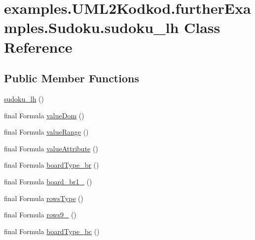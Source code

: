 \hypertarget{classexamples_1_1_u_m_l2_kodkod_1_1further_examples_1_1_sudoku_1_1sudoku__lh}{\section{examples.\-U\-M\-L2\-Kodkod.\-further\-Examples.\-Sudoku.\-sudoku\-\_\-lh Class Reference}
\label{classexamples_1_1_u_m_l2_kodkod_1_1further_examples_1_1_sudoku_1_1sudoku__lh}
}
\subsection*{Public Member Functions}
\begin{DoxyCompactItemize}
\item 
\hyperlink{classexamples_1_1_u_m_l2_kodkod_1_1further_examples_1_1_sudoku_1_1sudoku__lh_ad5248425df2fe22a9e0e633b9776ead4}{sudoku\-\_\-lh} ()
\item 
final Formula \hyperlink{classexamples_1_1_u_m_l2_kodkod_1_1further_examples_1_1_sudoku_1_1sudoku__lh_a614683ab3e07f643d6d7ad8b9ad6c5ac}{value\-Dom} ()
\item 
final Formula \hyperlink{classexamples_1_1_u_m_l2_kodkod_1_1further_examples_1_1_sudoku_1_1sudoku__lh_a62d3a39808d9cefd29e39be936c5f6bc}{value\-Range} ()
\item 
final Formula \hyperlink{classexamples_1_1_u_m_l2_kodkod_1_1further_examples_1_1_sudoku_1_1sudoku__lh_a0d25047acda2d7f0e95fad408f247a19}{value\-Attribute} ()
\item 
final Formula \hyperlink{classexamples_1_1_u_m_l2_kodkod_1_1further_examples_1_1_sudoku_1_1sudoku__lh_a12c6ad74d697b186bed8945c6e271445}{board\-Type\-\_\-br} ()
\item 
final Formula \hyperlink{classexamples_1_1_u_m_l2_kodkod_1_1further_examples_1_1_sudoku_1_1sudoku__lh_ac75a28ebdcae15de7bb06079083afc3c}{board\-\_\-br1\-\_} ()
\item 
final Formula \hyperlink{classexamples_1_1_u_m_l2_kodkod_1_1further_examples_1_1_sudoku_1_1sudoku__lh_a4cc946bd2eb476c34c32382109c83cac}{rows\-Type} ()
\item 
final Formula \hyperlink{classexamples_1_1_u_m_l2_kodkod_1_1further_examples_1_1_sudoku_1_1sudoku__lh_a5e7fbb025a85c4878fa1941b6b49f719}{rows9\-\_} ()
\item 
final Formula \hyperlink{classexamples_1_1_u_m_l2_kodkod_1_1further_examples_1_1_sudoku_1_1sudoku__lh_a539d04d6cc9ffaaa05c7a8d07dabddb2}{board\-Type\-\_\-bc} ()

\end{DoxyCompactItemize}
